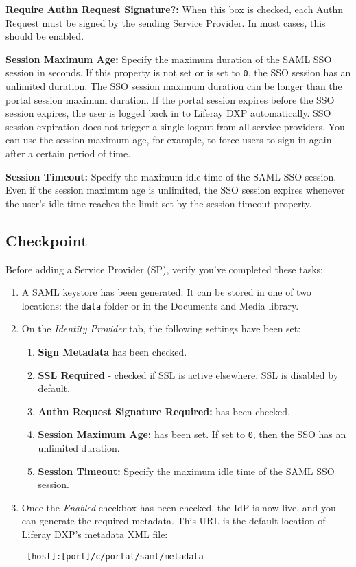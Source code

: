 \textbf{Require Authn Request Signature?:} When this box is checked,
each Authn Request must be signed by the sending Service Provider. In
most cases, this should be enabled.

\textbf{Session Maximum Age:} Specify the maximum duration of the SAML
SSO session in seconds. If this property is not set or is set to
\texttt{0}, the SSO session has an unlimited duration. The SSO session
maximum duration can be longer than the portal session maximum duration.
If the portal session expires before the SSO session expires, the user
is logged back in to Liferay DXP automatically. SSO session expiration
does not trigger a single logout from all service providers. You can use
the session maximum age, for example, to force users to sign in again
after a certain period of time.

\textbf{Session Timeout:} Specify the maximum idle time of the SAML SSO
session. Even if the session maximum age is unlimited, the SSO session
expires whenever the user's idle time reaches the limit set by the
session timeout property.

\subsection{Checkpoint}\label{checkpoint}

Before adding a Service Provider (SP), verify you've completed these
tasks:

\begin{enumerate}
\def\labelenumi{\arabic{enumi}.}
\item
  A SAML keystore has been generated. It can be stored in one of two
  locations: the \texttt{data} folder or in the Documents and Media
  library.
\item
  On the \emph{Identity Provider} tab, the following settings have been
  set:

  \begin{enumerate}
  \def\labelenumii{\alph{enumii}.}
  \item
    \textbf{Sign Metadata} has been checked.
  \item
    \textbf{SSL Required} - checked if SSL is active elsewhere. SSL is
    disabled by default.
  \item
    \textbf{Authn Request Signature Required:} has been checked.
  \item
    \textbf{Session Maximum Age:} has been set. If set to \texttt{0},
    then the SSO has an unlimited duration.
  \item
    \textbf{Session Timeout:} Specify the maximum idle time of the SAML
    SSO session.
  \end{enumerate}
\item
  Once the \emph{Enabled} checkbox has been checked, the IdP is now
  live, and you can generate the required metadata. This URL is the
  default location of Liferay DXP's metadata XML file:

\begin{verbatim}
 [host]:[port]/c/portal/saml/metadata 
\end{verbatim}
\end{enumerate}

